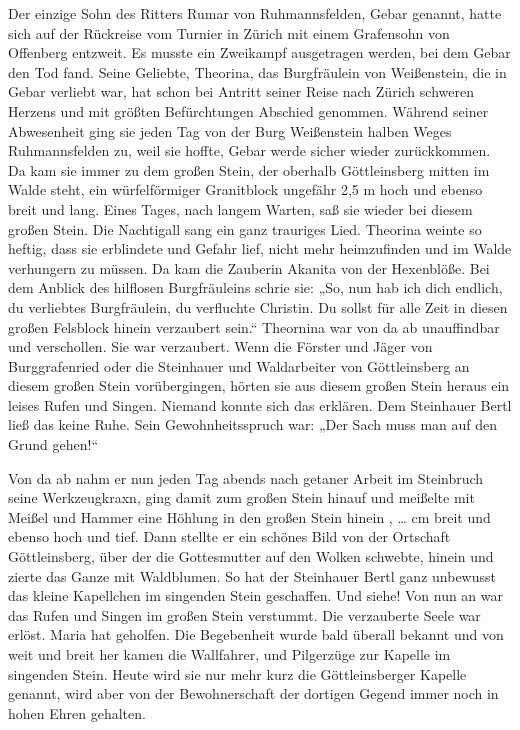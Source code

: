 \documentclass{book}
\begin{document}
Der einzige Sohn des Ritters Rumar von Ruhmannsfelden, Gebar genannt, hatte sich
auf der Rückreise vom Turnier in Zürich mit einem Grafensohn von Offenberg
entzweit. Es musste ein Zweikampf ausgetragen werden, bei dem Gebar den Tod
fand. Seine Geliebte, Theorina, das Burgfräulein von Weißenstein, die in Gebar
verliebt war, hat schon bei Antritt seiner Reise nach Zürich schweren Herzens
und mit größten Befürchtungen Abschied genommen. Während seiner Abwesenheit ging
sie jeden Tag von der Burg Weißenstein halben Weges Ruhmannsfelden zu, weil sie
hoffte, Gebar werde sicher wieder zurückkommen. Da kam sie immer zu dem großen
Stein, der oberhalb Göttleinsberg mitten im Walde steht, ein würfelförmiger
Granitblock ungefähr 2,5 m hoch und ebenso breit und lang. Eines Tages, nach
langem Warten, saß sie wieder bei diesem großen Stein. Die Nachtigall sang ein
ganz trauriges Lied. Theorina weinte so heftig, dass sie erblindete und Gefahr
lief, nicht mehr heimzufinden und im Walde verhungern zu müssen. Da kam die
Zauberin Akanita von der Hexenblöße. Bei dem Anblick des hilflosen Burgfräuleins
schrie sie: „So, nun hab ich dich endlich, du verliebtes Burgfräulein, du
verfluchte Christin. Du sollst für alle Zeit in diesen großen Felsblock hinein
verzaubert sein.“ Theornina war von da ab unauffindbar und verschollen. Sie war
verzaubert. Wenn die Förster und Jäger von Burggrafenried oder die Steinhauer
und Waldarbeiter von Göttleinsberg an diesem großen Stein vorübergingen, hörten
sie aus diesem großen Stein heraus ein leises Rufen und Singen. Niemand konnte
sich das erklären. Dem Steinhauer Bertl ließ das keine Ruhe. Sein
Gewohnheitsspruch war: „Der Sach muss man auf den Grund gehen!“

Von da ab nahm er nun jeden Tag abends nach getaner Arbeit im Steinbruch seine
Werkzeugkraxn, ging damit zum großen Stein hinauf und meißelte mit Meißel und
Hammer eine Höhlung in den großen Stein hinein , … cm breit und ebenso hoch und
tief. Dann stellte er ein schönes Bild von der Ortschaft Göttleinsberg, über der
die Gottesmutter auf den Wolken schwebte, hinein und zierte das Ganze mit
Waldblumen. So hat der Steinhauer Bertl ganz unbewusst das kleine Kapellchen im
singenden Stein geschaffen. Und siehe! Von nun an war das Rufen und Singen im
großen Stein verstummt. Die verzauberte Seele war erlöst. Maria hat geholfen.
Die Begebenheit wurde bald überall bekannt und von weit und breit her kamen die
Wallfahrer, und Pilgerzüge zur Kapelle im singenden Stein. Heute wird sie nur
mehr kurz die Göttleinsberger Kapelle genannt, wird aber von der Bewohnerschaft
der dortigen Gegend immer noch in hohen Ehren gehalten.
\end{document}
